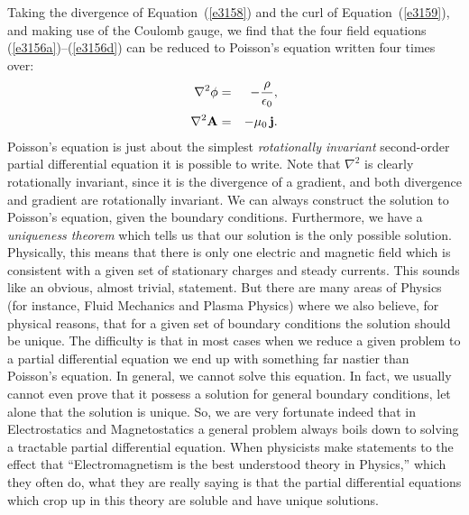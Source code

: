  Taking the 
divergence of Equation~(\ref{e3158}) and the curl of Equation~(\ref{e3159}), and making use of the 
Coulomb gauge, we find that the four field equations (\ref{e3156a})--(\ref{e3156d}) can be reduced to
Poisson's equation written four times over:
\begin{eqnarray}
\nabla^2 \phi &=& - \frac{\rho}{\epsilon_0},\label{e3164a}\\[0.5ex]
\nabla^2{\bf A} &=& - \mu_0 \,{\bf j}.\label{e3164b}
\end{eqnarray}
Poisson's equation is just about the simplest {\em rotationally invariant} second-order
partial differential equation it is possible to write. Note that
$\nabla^2$ is clearly rotationally invariant, since it is the divergence of
a gradient, and both divergence and gradient are rotationally invariant.
We can always construct the solution to Poisson's equation, given the
boundary conditions. Furthermore, we have a {\em uniqueness theorem} which tells us
that our solution is the only possible solution. Physically, this means that
 there is only one electric and magnetic
field which is consistent with a given set of stationary charges and steady currents.
This sounds like an obvious, almost trivial, statement. But there are many
areas of Physics (for instance, Fluid Mechanics and Plasma Physics) where
we also believe, for physical reasons, that for a given set of boundary conditions
the solution should be unique. The difficulty is that  in most cases 
when we reduce a given problem to a partial differential equation we end up with
something far nastier than Poisson's equation. In general, we cannot solve
this equation. In fact, we usually cannot even prove that  it
possess a solution for general boundary conditions, let alone that the solution
is unique. So, we are very fortunate indeed that
in Electrostatics and Magnetostatics a general problem always boils down to solving a
tractable  partial differential equation. When physicists make statements to the effect that
``Electromagnetism is the best understood theory in Physics,'' which they often do, what they are really
saying is that the partial differential equations which crop up in this
theory are soluble and have unique solutions.

